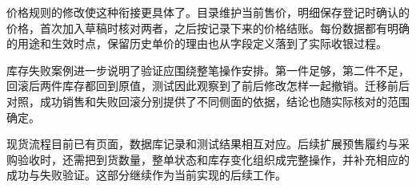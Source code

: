 \documentclass{SYSUReport}
\begin{document}
价格规则的修改使这种衔接更具体了。目录维护当前售价，明细保存登记时确认的价格，首次加入草稿时核对两者，之后按记录下来的价格结账。每份数据都有明确的用途和生效时点，保留历史单价的理由也从字段定义落到了实际收银过程。

库存失败案例进一步说明了验证应围绕整笔操作安排。第一件足够，第二件不足，回滚后两件库存都回到原值，测试因此观察到了前后修改怎样一起撤销。迁移前后对照，成功销售和失败回滚分别提供了不同侧面的依据，结论也随实际核对的范围确定。

现货流程目前已有页面，数据库记录和测试结果相互对应。后续扩展预售履约与采购验收时，还需把到货数量，整单状态和库存变化组织成完整操作，并补充相应的成功与失败验证。这部分继续作为当前实现的后续工作。
\end{document}
